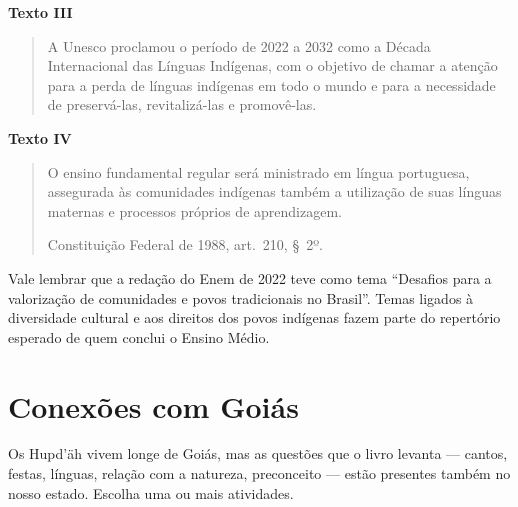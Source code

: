 \textbf{Texto III}
\begin{quote}
A Unesco proclamou o período de 2022 a 2032 como a Década Internacional
das Línguas Indígenas, com o objetivo de chamar a atenção para a perda
de línguas indígenas em todo o mundo e para a necessidade de
preservá-las, revitalizá-las e promovê-las.
\end{quote}

\textbf{Texto IV}
\begin{quote}
O ensino fundamental regular será ministrado em língua portuguesa,
assegurada às comunidades indígenas também a utilização de suas línguas
maternas e processos próprios de aprendizagem.

\hfill Constituição Federal de 1988, art.~210, §~2º.
\end{quote}

Vale lembrar que a redação do Enem de 2022 teve como tema ``Desafios
para a valorização de comunidades e povos tradicionais no Brasil''.
Temas ligados à diversidade cultural e aos direitos dos povos indígenas
fazem parte do repertório esperado de quem conclui o Ensino Médio.

\chapter{Conexões com Goiás}

Os Hupd'äh vivem longe de Goiás, mas as questões que o livro levanta
--- cantos, festas, línguas, relação com a natureza, preconceito --- estão
presentes também no nosso estado. Escolha uma ou mais atividades.

